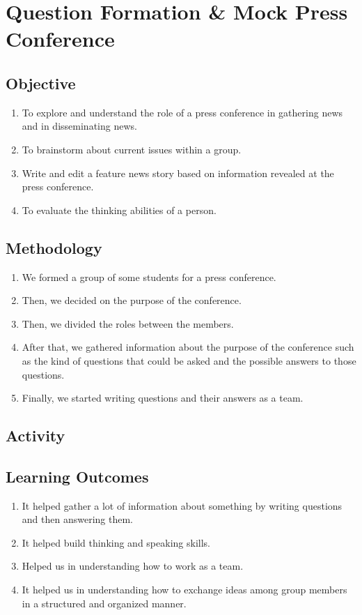 \pagebreak

\section{Question Formation \& Mock Press Conference}

\subsection{Objective}
\begin{enumerate}
    \item To explore and understand the role of a press conference in gathering news and in
          disseminating news.
    \item To brainstorm about current issues within a group.
    \item Write and edit a feature news story based on information revealed at the press
          conference.
    \item To evaluate the thinking abilities of a person.
\end{enumerate}

\subsection{Methodology}
\begin{enumerate}
    \item We formed a group of some students for a press conference.
    \item Then, we decided on the purpose of the conference.
    \item Then, we divided the roles between the members.
    \item After that, we gathered information about the purpose of the conference such as the
          kind of questions that could be asked and the possible answers to those questions.
    \item Finally, we started writing questions and their answers as a team.
\end{enumerate}

\subsection{Activity}

\subsection{Learning Outcomes}
\begin{enumerate}
    \item It helped gather a lot of information about something by writing questions and then
          answering them.
    \item It helped build thinking and speaking skills.
    \item Helped us in understanding how to work as a team.
    \item It helped us in understanding how to exchange ideas among group members in a
          structured and organized manner.
\end{enumerate}

\pagebreak
